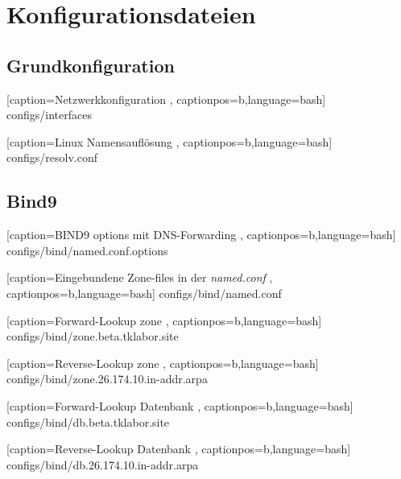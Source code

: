 \section{Konfigurationsdateien}

\subsection{Grundkonfiguration}

    [caption={Netzwerkkonfiguration}
       \label{lst:interfaces-cfg},
       captionpos=b,language=bash]
{configs/interfaces}


    [caption={Linux Namensauflösung}
       \label{lst:resolv.conf-cfg},
       captionpos=b,language=bash]
{configs/resolv.conf}

\subsection{Bind9}

    [caption={BIND9 options mit DNS-Forwarding}
       \label{lst:named.conf.options-cfg},
       captionpos=b,language=bash]
{configs/bind/named.conf.options}


    [caption={Eingebundene Zone-files in der \textit{named.conf}}
       \label{lst:named.conf-cfg},
       captionpos=b,language=bash]
{configs/bind/named.conf}


    [caption={Forward-Lookup zone}
       \label{lst:forward-zone-cfg},
       captionpos=b,language=bash]
{configs/bind/zone.beta.tklabor.site}


    [caption={Reverse-Lookup zone}
       \label{lst:reverse-zone-cfg},
       captionpos=b,language=bash]
{configs/bind/zone.26.174.10.in-addr.arpa}


    [caption={Forward-Lookup Datenbank}
       \label{lst:forware-zone-db-cfg},
       captionpos=b,language=bash]
{configs/bind/db.beta.tklabor.site}


    [caption={Reverse-Lookup Datenbank}
       \label{lst:reverse-zone-db-cfg},
       captionpos=b,language=bash]
{configs/bind/db.26.174.10.in-addr.arpa}


